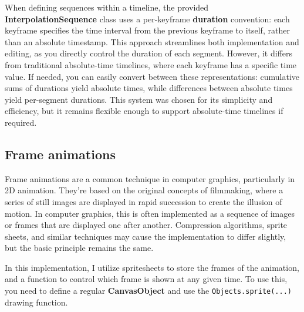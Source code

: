 \pagebreak

\begin{Note}
    When defining sequences within a timeline, the provided \textbf{InterpolationSequence} class uses a per-keyframe \textbf{duration} convention: each keyframe specifies the time interval from the previous keyframe to itself, rather than an absolute timestamp. This approach streamlines both implementation and editing, as you directly control the duration of each segment. However, it differs from traditional absolute-time timelines, where each keyframe has a specific time value. If needed, you can easily convert between these representations: cumulative sums of durations yield absolute times, while differences between absolute times yield per-segment durations. This system was chosen for its simplicity and efficiency, but it remains flexible enough to support absolute-time timelines if required.
\end{Note}


\vspace{60pt}

\subsection{Frame animations}
\label{subsec:frame-animations}

Frame animations are a common technique in computer graphics, particularly in 2D animation. They're based on the original concepts of filmmaking, where a series of still images are displayed in rapid succession to create the illusion of motion. In computer graphics, this is often implemented as a sequence of images or frames that are displayed one after another. Compression algorithms, sprite sheets, and similar techniques may cause the implementation to differ slightly, but the basic principle remains the same.

\begin{Note}
    In this implementation, I utilize spritesheets to store the frames of the animation, and a function to control which frame is shown at any given time. To use this, you need to define a regular \textbf{CanvasObject} and use the {\footnotesize\texttt{Objects.sprite(...)}} drawing function.
\end{Note}

